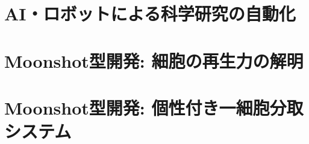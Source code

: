 \thispagestyle{fancy2}

\section{AI・ロボットによる科学研究の自動化}

\section{Moonshot型開発: 細胞の再生力の解明}

\section{Moonshot型開発: 個性付き一細胞分取システム}